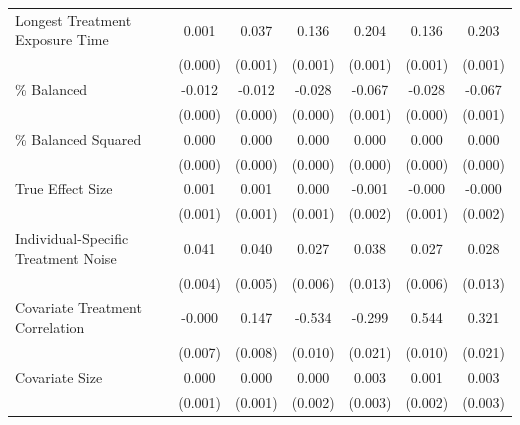 \documentclass[12pt]{article}
\begin{document}
\begin{landscape}
\begin{table}[htbp]
{\begin{tabular}{l*{6}{c}}
Longest Treatment Exposure Time&       0.001\sym{**} &       0.037\sym{***}&       0.136\sym{***}&       0.204\sym{***}&       0.136\sym{***}&       0.203\sym{***}\\
                    &     (0.000)         &     (0.001)         &     (0.001)         &     (0.001)         &     (0.001)         &     (0.001)         \\
\% Balanced          &      -0.012\sym{***}&      -0.012\sym{***}&      -0.028\sym{***}&      -0.067\sym{***}&      -0.028\sym{***}&      -0.067\sym{***}\\
                    &     (0.000)         &     (0.000)         &     (0.000)         &     (0.001)         &     (0.000)         &     (0.001)         \\
\% Balanced Squared  &       0.000\sym{***}&       0.000\sym{***}&       0.000\sym{***}&       0.000\sym{***}&       0.000\sym{***}&       0.000\sym{***}\\
                    &     (0.000)         &     (0.000)         &     (0.000)         &     (0.000)         &     (0.000)         &     (0.000)         \\
True Effect Size    &       0.001         &       0.001\sym{*}  &       0.000         &      -0.001         &      -0.000         &      -0.000         \\
                    &     (0.001)         &     (0.001)         &     (0.001)         &     (0.002)         &     (0.001)         &     (0.002)         \\
Individual-Specific Treatment Noise&       0.041\sym{***}&       0.040\sym{***}&       0.027\sym{***}&       0.038\sym{**} &       0.027\sym{***}&       0.028\sym{*}  \\
                    &     (0.004)         &     (0.005)         &     (0.006)         &     (0.013)         &     (0.006)         &     (0.013)         \\
Covariate Treatment Correlation&      -0.000         &       0.147\sym{***}&      -0.534\sym{***}&      -0.299\sym{***}&       0.544\sym{***}&       0.321\sym{***}\\
                    &     (0.007)         &     (0.008)         &     (0.010)         &     (0.021)         &     (0.010)         &     (0.021)         \\
Covariate Size      &       0.000         &       0.000         &       0.000         &       0.003         &       0.001         &       0.003         \\
                    &     (0.001)         &     (0.001)         &     (0.002)         &     (0.003)         &     (0.002)         &     (0.003)         \\

\end{tabular}}
\end{table}
\end{landscape}
\end{document}
